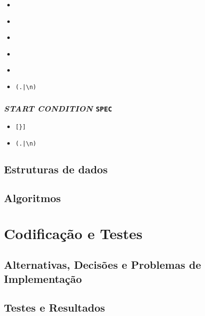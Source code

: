 \begin{itemize}
\item 
\begin{verbatim}
\end{verbatim}

\item 
\begin{verbatim}
\end{verbatim}

\item 
\begin{verbatim}
\end{verbatim}

\item 
\begin{verbatim}
\end{verbatim}
\item 
\begin{verbatim}
\end{verbatim}

\item 
\begin{verbatim}
(.|\n)
\end{verbatim}

\end{itemize}
\subsubsection{\emph{START CONDITION} \texttt{SPEC}}

\begin{itemize}
\item 

\begin{verbatim}
[}]
\end{verbatim}

\item 
\begin{verbatim}
(.|\n)
\end{verbatim}
\end{itemize}



\subsection{Estruturas de dados}

\subsection{Algoritmos}

\section{Codificação e Testes}
\label{sec:ts:b2}

\subsection{Alternativas, Decisões e Problemas de Implementação}

\subsection{Testes e Resultados}
